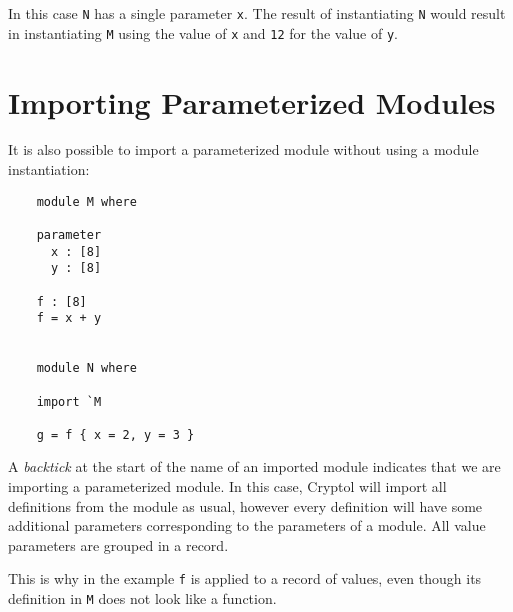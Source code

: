 In this case \texttt{N} has a single parameter \texttt{x}.  The result of instantiating
\texttt{N} would result in instantiating \texttt{M} using the value of \texttt{x} and \texttt{12}
for the value of \texttt{y}.


\section{Importing Parameterized Modules}

It is also possible to import a parameterized module without using
a module instantiation:

\begin{verbatim}
    module M where

    parameter
      x : [8]
      y : [8]

    f : [8]
    f = x + y


    module N where

    import `M

    g = f { x = 2, y = 3 }
\end{verbatim}

A \textit{backtick} at the start of the name of an imported module indicates
that we are importing a parameterized module.  In this case, Cryptol
will import all definitions from the module as usual, however every
definition will have some additional parameters corresponding to
the parameters of a module.  All value parameters are grouped in a record.

This is why in the example \texttt{f} is applied to a record of values,
even though its definition in \texttt{M} does not look like a function.
